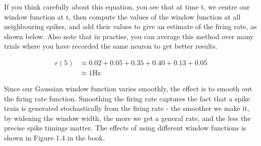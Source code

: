 \documentclass{article}
\begin{document}
If you think carefully about this equation, you see that at time t, we centre our window function at t, then compute the values of the window function at all neighbouring spikes, and add their values to give an estimate of the firing rate, as shown below. Also note that in practise, you can average this method over many trials where you have recorded the same neuron to get better results.\\

\begin{figure}[H]
	\centering


	\begin{align*}
		r(5) & \approx 0.02 + 0.05 + 0.35 + 0.40 + 0.13 + 0.05 \\
		     & \approx 1 \text{Hz}
	\end{align*}
\end{figure}

Since our Gaussian window function varies smoothly, the effect is to smooth out the firing rate function. Smoothing the firing rate captures the fact that a spike train is generated stochastically from the firing rate - the smoother we make it, by widening the window width, the more we get a general rate, and the less the precise spike timings matter. The effects of using different window functions is shown in Figure 1.4 in the book.
\end{document}
